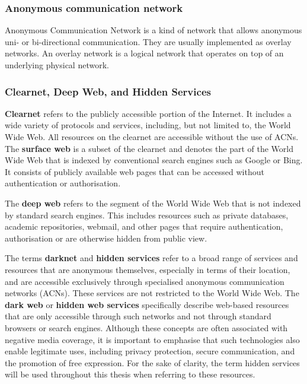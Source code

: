 \subsubsection{Anonymous communication network}
Anonymous Communication Network is a kind of network that allows anonymous uni- or bi-directional communication. They are usually implemented as overlay networks. An overlay network is a logical network that operates on top of an underlying physical network.

\subsubsection{Clearnet, Deep Web, and Hidden Services}

\textbf{Clearnet} refers to the publicly accessible portion of the Internet. It includes a wide variety of protocols and services, including, but not limited to, the World Wide Web. All resources on the clearnet are accessible without the use of ACNs. The \textbf{surface web} is a subset of the clearnet and denotes the part of the World Wide Web that is indexed by conventional search engines such as Google or Bing. It consists of publicly available web pages that can be accessed without authentication or authorisation.

The \textbf{deep web} refers to the segment of the World Wide Web that is not indexed by standard search engines. This includes resources such as private databases, academic repositories, webmail, and other pages that require authentication, authorisation or are otherwise hidden from public view.

The terms \textbf{darknet} and \textbf{hidden services} refer to a broad range of services and resources that are anonymous themselves, especially in terms of their location, and are accessible exclusively through specialised anonymous communication networks (ACNs). These services are not restricted to the World Wide Web. The \textbf{dark web} or \textbf{hidden web services} specifically describe web-based resources that are only accessible through such networks and not through standard browsers or search engines. Although these concepts are often associated with negative media coverage, it is important to emphasise that such technologies also enable legitimate uses, including privacy protection, secure communication, and the promotion of free expression. For the sake of clarity, the term hidden services will be used throughout this thesis when referring to these resources.



